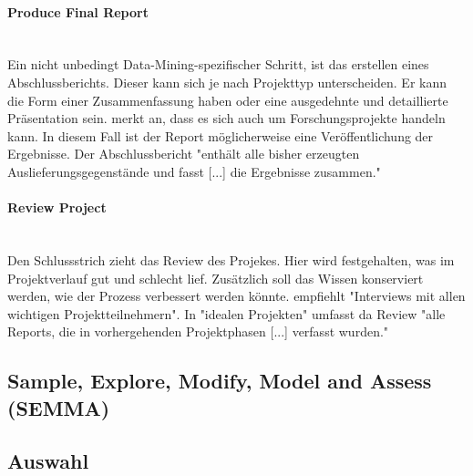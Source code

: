 \paragraph{Produce Final Report}\mbox{} \\
Ein nicht unbedingt Data-Mining-spezifischer Schritt, ist das erstellen eines Abschlussberichts. Dieser kann sich je nach Projekttyp unterscheiden. Er kann die Form einer Zusammenfassung haben oder eine ausgedehnte und detaillierte Präsentation sein. \citep[Punkt 1.4.1.1]{larose_discovering_2014} merkt an, dass es sich auch um Forschungsprojekte handeln kann. In diesem Fall ist der Report möglicherweise  eine Veröffentlichung der Ergebnisse. Der Abschlussbericht "enthält alle bisher erzeugten Auslieferungsgegenstände und fasst [...] die Ergebnisse zusammen."\citep[S~18; eigene Übersetzung]{shearer_crisp-dm_2000}

\paragraph{Review Project}\mbox{} \\
Den Schlussstrich zieht das Review des Projekes. Hier wird festgehalten, was im Projektverlauf gut und schlecht lief. Zusätzlich soll das Wissen konserviert werden, wie der Prozess verbessert werden könnte.   \newline
\citep[S.~18; eigene Übersetzung]{shearer_crisp-dm_2000} empfiehlt "Interviews mit allen wichtigen Projektteilnehmern". In "idealen Projekten" umfasst da Review "alle Reports, die in vorhergehenden Projektphasen [...] verfasst wurden."\citep[S.~29; eigene Übersetzung]{chapman_crisp-dm_2000}







\subsection{Sample, Explore, Modify, Model and Assess (SEMMA)}
\subsection{Auswahl}



